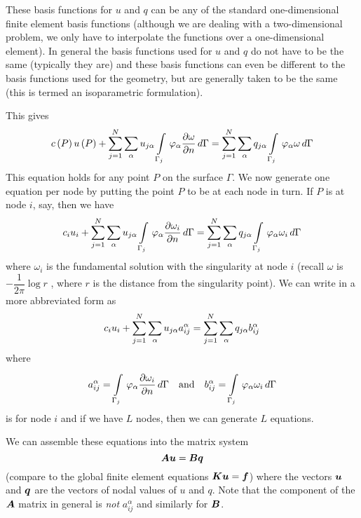 These basis functions for $u$ and $q$ can be any of the standard
one-dimensional finite element basis functions (although we are dealing with a
two-dimensional problem, we only have to interpolate the functions over a
one-dimensional element).  In general the basis functions used for $u$ and $q$
do not have to be the same (typically they are) and these basis functions can
even be different to the basis functions used for the geometry, but are
generally taken to be the same (this is termed an 
isoparametric formulation).

This gives
\begin{equation}
   c\left( P \right)   u\left( P \right) +  \displaystyle\sum_{j=1}^{N}   \displaystyle\sum_{\alpha}^{}  u_{j\alpha} 
    \displaystyle\int\limits_{\Gamma_{j}}^{} \, \varphi_{\alpha}   \dfrac{\partial \omega}{\partial n} \,d\Gamma  = 
   \displaystyle\sum_{j=1}^{N}  \displaystyle\sum_{\alpha}^{} 
  q_{j\alpha}  \displaystyle\int\limits_{\Gamma_{j}}^{} \, \varphi_{\alpha}  \omega\,d\Gamma 
  \label{eqn:isopar}
\end{equation}
This equation holds for any point $P$ on the surface $\Gamma$.  We now
generate one equation per node by putting the point $P$ to be at each node in
turn.  If $P$ is at node $i$, say, then we have
\begin{equation}
  c_{i}u_{i}+ \displaystyle\sum_{j=1}^{N}   \displaystyle\sum_{\alpha}^{}  u_{j\alpha} 
    \displaystyle\int\limits_{\Gamma_{j}}^{} \, \varphi_{\alpha}   \dfrac{\partial \omega_i}{\partial n} \,d\Gamma   = 
   \displaystyle\sum_{j=1}^{N}  \displaystyle\sum_{\alpha}^{}  q_{j\alpha}  \displaystyle\int\limits_{\Gamma_{j}}^{} \, \varphi_{\alpha}  
  \omega_{i}\,d\Gamma 
  \label{eqn:isopar2}
\end{equation}
where $\omega_{i}$ is the fundamental solution with the singularity at node $i$
(recall $\omega$ is $-\dfrac{1}{2 \pi} \log r$ , where $r$ is the distance from the
singularity point). We can write  in a more abbreviated form
as
\begin{equation}
  c_{i} u_{i} +  \displaystyle\sum_{j=1}^{N}   \displaystyle\sum_{\alpha}^{}  u_{j\alpha}a_{ij}^{\alpha} =
   \displaystyle\sum_{j=1}^{N}   \displaystyle\sum_{\alpha}^{}  q_{j\alpha}b_{ij}^{\alpha}
  \label{eqn:isopar3}
\end{equation}
where
\begin{equation}
  a_{ij}^{\alpha} =   \displaystyle\int\limits_{\Gamma_{j}}^{} \, \varphi_{\alpha} 
     \dfrac{\partial \omega_i}{\partial n} \,d\Gamma  \quad \text{and} \quad  b_{ij}^{\alpha} = 
    \displaystyle\int\limits_{\Gamma_{j}}^{} \, \varphi_{\alpha}  \omega_{i}\,d\Gamma 
  \label{eqn:isopar4}
\end{equation}
 is for node $i$ and if we have $L$ nodes, then we can
generate $L$ equations.  

We can assemble these equations into the matrix system
\begin{equation}
  \matr{A}\vect{u} = \matr{B}\vect{q}
  \label{eqn:ms}
\end{equation}
(compare to the global finite element equations $\matr{K}\vect{u} = \vect{f}$)
where the vectors $\vect{u}$ and $\vect{q}$ are the vectors of nodal values of
$u$ and $q$.  Note that the  component of the $\matr{A}$ matrix in general
is \emph{not} $a_{ij}^{\alpha}$ and similarly for $\matr{B}$.


